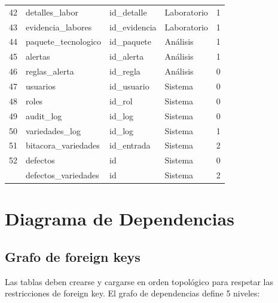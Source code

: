 \documentclass[12pt,a4paper,twoside]{report}
\begin{document}
\begin{longtable}{clllc}
42 & detalles\_labor            & id\_detalle       & Laboratorio & 1 \\
43 & evidencia\_labores         & id\_evidencia     & Laboratorio & 1 \\
44 & paquete\_tecnologico       & id\_paquete       & An\'alisis & 1 \\
45 & alertas                    & id\_alerta        & An\'alisis & 1 \\
46 & reglas\_alerta             & id\_regla         & An\'alisis & 0 \\
47 & usuarios                   & id\_usuario       & Sistema   & 0 \\
48 & roles                      & id\_rol           & Sistema   & 0 \\
49 & audit\_log                 & id\_log           & Sistema   & 0 \\
50 & variedades\_log            & id\_log           & Sistema   & 1 \\
51 & bitacora\_variedades       & id\_entrada       & Sistema   & 2 \\
52 & defectos                   & id               & Sistema   & 0 \\
   & defectos\_variedades       & id               & Sistema   & 2 \\
\end{longtable}

\chapter{Diagrama de Dependencias}

\section{Grafo de foreign keys}

Las tablas deben crearse y cargarse en orden topol\'ogico para respetar las restricciones de foreign key. El grafo de dependencias define 5 niveles:
\end{document}
